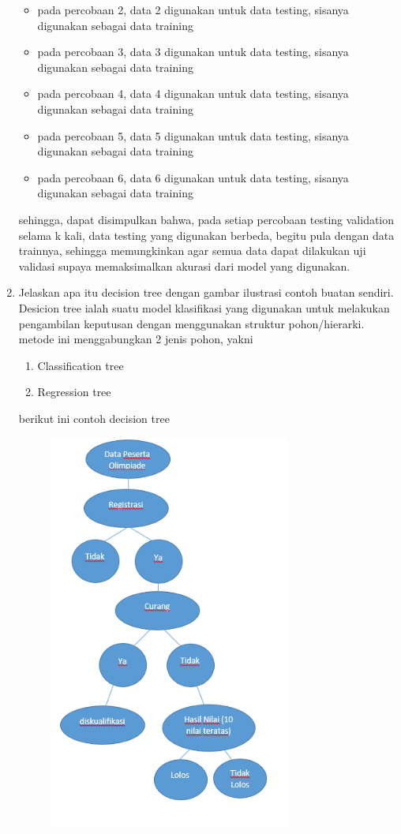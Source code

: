 \begin{enumerate}
\begin{itemize}
    \item pada percobaan 2, data 2 digunakan untuk data testing, sisanya digunakan sebagai data training
    \item pada percobaan 3, data 3 digunakan untuk data testing, sisanya digunakan sebagai data training
    \item pada percobaan 4, data 4 digunakan untuk data testing, sisanya digunakan sebagai data training
    \item pada percobaan 5, data 5 digunakan untuk data testing, sisanya digunakan sebagai data training
    \item pada percobaan 6, data 6 digunakan untuk data testing, sisanya digunakan sebagai data training
\end{itemize}
sehingga, dapat disimpulkan bahwa, pada setiap percobaan testing validation selama k kali, data testing yang digunakan berbeda, begitu pula dengan data trainnya, sehingga memungkinkan agar semua data dapat dilakukan uji validasi supaya memaksimalkan akurasi dari model yang digunakan.
\item
Jelaskan apa itu decision tree dengan gambar ilustrasi contoh buatan sendiri.\\
Desicion tree ialah suatu model klasifikasi yang digunakan untuk melakukan pengambilan keputusan dengan menggunakan struktur pohon/hierarki.
metode ini menggabungkan 2 jenis pohon, yakni
\begin{enumerate}
    \item Classification tree
    \item Regression tree
\end{enumerate}
berikut ini contoh decision tree
\begin{figure}[H]
    \centering
    \includegraphics[width=0.75\textwidth]{figures/decisiontree.png}

\end{figure}
\end{enumerate}
